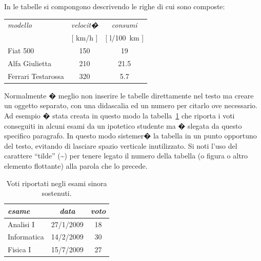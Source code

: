 In \ltx le tabelle si compongono descrivendo le righe di cui sono composte:
\begin{center}
\begin{tabular}{|l|c|c|}%
\hline
\textit{modello} & \textit{velocit�} & \textit{consumi} \\
                 & [ \si{km/h} ]          & [ l/\SI{100}{km} ] \\
\hline
Fiat 500 & 150 & 19 \\
Alfa Giulietta & 210 & 21.5 \\
Ferrari Testarossa & 320 & 5.7 \\
\hline
\end{tabular}
\end{center}
Normalmente � meglio non inserire le tabelle direttamente nel testo ma creare un oggetto separato, con una didascalia ed un numero per citarlo ove necessario. Ad esempio � stata creata in questo modo la tabella~\ref{tab:voti} che riporta i voti conseguiti in alcuni esami da un ipotetico studente ma � slegata da questo specifico paragrafo. In questo modo \ltx sistemer� la tabella in un punto opportuno del testo, evitando di lasciare spazio verticale inutilizzato.
Si noti l'uso del carattere ``tilde'' (\textasciitilde) per tenere legato il numero della tabella (o figura o altro elemento flottante) alla parola che lo precede.

\begin{table}[tbh] %
\begin{center}
\begin{tabular}{|l|c|c|}
\hline
\textit{esame} & \textit{data} & \textit{voto} \\
\hline
Analisi I & 27/1/2009 & 18 \\
Informatica & 14/2/2009 & 30 \\
Fisica I & 15/7/2009 & 27 \\
\hline
\end{tabular}
\caption{Voti riportati negli esami sinora sostenuti.\label{tab:voti}}
\end{center}
\end{table}

